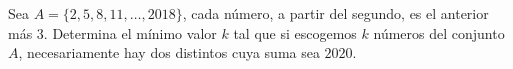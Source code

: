 Sea $A = \{2, 5, 8, 11, \dots , 2018\}$, cada número, a partir del segundo, es el anterior más $3$. Determina el mínimo valor $k$ tal que si escogemos $k$ números del conjunto $A$, necesariamente hay dos distintos cuya suma sea $2020$.